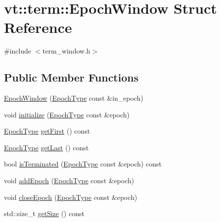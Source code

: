 \hypertarget{structvt_1_1term_1_1_epoch_window}{}\section{vt\+:\+:term\+:\+:Epoch\+Window Struct Reference}
\label{structvt_1_1term_1_1_epoch_window}


{\ttfamily \#include $<$term\+\_\+window.\+h$>$}

\subsection*{Public Member Functions}
\begin{DoxyCompactItemize}
\item 
\hyperlink{structvt_1_1term_1_1_epoch_window_a48e5c7c25ba6572ef86f82ee7c7af2ed}{Epoch\+Window} (\hyperlink{namespacevt_a985a5adf291c34a3ca263b3378388236}{Epoch\+Type} const \&in\+\_\+epoch)
\item 
void \hyperlink{structvt_1_1term_1_1_epoch_window_a2c55839ab883365d71d1de785744df9e}{initialize} (\hyperlink{namespacevt_a985a5adf291c34a3ca263b3378388236}{Epoch\+Type} const \&epoch)
\item 
\hyperlink{namespacevt_a985a5adf291c34a3ca263b3378388236}{Epoch\+Type} \hyperlink{structvt_1_1term_1_1_epoch_window_a2775ad5ee039b9c319403ec4184cdd1c}{get\+First} () const
\item 
\hyperlink{namespacevt_a985a5adf291c34a3ca263b3378388236}{Epoch\+Type} \hyperlink{structvt_1_1term_1_1_epoch_window_a3e3f2c54fef79025183e4edb61f404dd}{get\+Last} () const
\item 
bool \hyperlink{structvt_1_1term_1_1_epoch_window_a9617344ff1e04ab54dd4a414ac42c349}{is\+Terminated} (\hyperlink{namespacevt_a985a5adf291c34a3ca263b3378388236}{Epoch\+Type} const \&epoch) const
\item 
void \hyperlink{structvt_1_1term_1_1_epoch_window_a38502baeeae067a563d611e0e31e5e44}{add\+Epoch} (\hyperlink{namespacevt_a985a5adf291c34a3ca263b3378388236}{Epoch\+Type} const \&epoch)
\item 
void \hyperlink{structvt_1_1term_1_1_epoch_window_ac4f58e068b8458f8fd8520474ab8e4c7}{close\+Epoch} (\hyperlink{namespacevt_a985a5adf291c34a3ca263b3378388236}{Epoch\+Type} const \&epoch)
\item 
std\+::size\+\_\+t \hyperlink{structvt_1_1term_1_1_epoch_window_ac33e7c5184370881532550540f2aa7b3}{get\+Size} () const
\end{DoxyCompactItemize}
